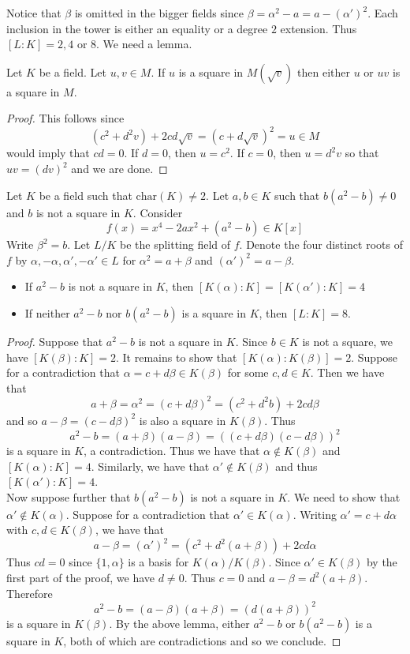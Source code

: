 \documentclass[a4paper]{article}
\begin{document}
Notice that $\beta$ is omitted in the bigger fields since $\beta=\alpha^2-a=a-(\alpha')^2$. Each inclusion in the tower is either an equality or a degree $2$ extension. Thus $[L:K]=2,4$ or $8$. We need a lemma. 

\begin{lmm}{}{} Let $K$ be a field. Let $u,v\in M$. If $u$ is a square in $M(\sqrt{v})$ then either $u$ or $uv$ is a square in $M$. 
\begin{proof}
This follows since $$(c^2+d^2v)+2cd\sqrt{v}=(c+d\sqrt{v})^2=u\in M$$ would imply that $cd=0$. If $d=0$, then $u=c^2$. If $c=0$, then $u=d^2v$ so that $uv=(dv)^2$ and we are done. 
\end{proof}
\end{lmm}

\begin{prp}{}{} Let $K$ be a field such that $\text{char}(K)\neq 2$. Let $a,b\in K$ such that $b(a^2-b)\neq 0$ and $b$ is not a square in $K$. Consider $$f(x)=x^4-2ax^2+(a^2-b)\in K[x]$$ Write $\beta^2=b$. Let $L/K$ be the splitting field of $f$. Denote the four distinct roots of $f$ by $\alpha,-\alpha,\alpha',-\alpha'\in L$ for $\alpha^2=a+\beta$ and $(\alpha')^2=a-\beta$. 
\begin{itemize}
\item If $a^2-b$ is not a square in $K$, then $[K(\alpha):K]=[K(\alpha'):K]=4$
\item If neither $a^2-b$ nor $b(a^2-b)$ is a square in $K$, then $[L:K]=8$. 
\end{itemize} 
\begin{proof}
Suppose that $a^2-b$ is not a square in $K$. Since $b\in K$ is not a square, we have $[K(\beta):K]=2$. It remains to show that $[K(\alpha):K(\beta)]=2$. Suppose for a contradiction that $\alpha=c+d\beta\in K(\beta)$ for some $c,d\in K$. Then we have that $$a+\beta=\alpha^2=(c+d\beta)^2=(c^2+d^2b)+2cd\beta$$ and so $a-\beta=(c-d\beta)^2$ is also a square in $K(\beta)$. Thus $$a^2-b=(a+\beta)(a-\beta)=((c+d\beta)(c-d\beta))^2$$ is a square in $K$, a contradiction. Thus we have that $\alpha\notin K(\beta)$ and $[K(\alpha):K]=4$. Similarly, we have that $\alpha'\notin K(\beta)$ and thus $[K(\alpha'):K]=4$. \\

Now suppose further that $b(a^2-b)$ is not a square in $K$. We need to show that $\alpha'\notin K(\alpha)$. Suppose for a contradiction that $\alpha'\in K(\alpha)$. Writing $\alpha'=c+d\alpha$ with $c,d\in K(\beta)$, we have that $$a-\beta=(\alpha')^2=(c^2+d^2(a+\beta))+2cd\alpha$$ Thus $cd=0$ since $\{1,\alpha\}$ is a basis for $K(\alpha)/K(\beta)$. Since $\alpha'\in K(\beta)$ by the first part of the proof, we have $d\neq 0$. Thus $c=0$ and $a-\beta=d^2(a+\beta)$. Therefore $$a^2-b=(a-\beta)(a+\beta)=(d(a+\beta))^2$$ is a square in $K(\beta)$. By the above lemma, either $a^2-b$ or $b(a^2-b)$ is a square in $K$, both of which are contradictions and so we conclude. 
\end{proof}
\end{prp}
\end{document}
